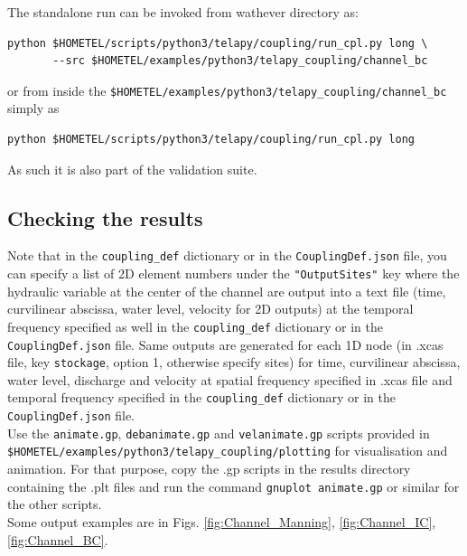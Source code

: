 \documentclass[Coupling]{../../data/TelemacDoc} %
\begin{document}
The standalone run can be invoked from wathever
directory as:
\begin{verbatim}
python $HOMETEL/scripts/python3/telapy/coupling/run_cpl.py long \
       --src $HOMETEL/examples/python3/telapy_coupling/channel_bc
\end{verbatim}
or from inside the
\texttt{\$HOMETEL/examples/python3/telapy\_coupling/channel\_bc}
simply as
\begin{verbatim}
python $HOMETEL/scripts/python3/telapy/coupling/run_cpl.py long
\end{verbatim}
As such it is also part of the validation suite.

\subsection{Checking the results}
Note that in the \texttt{coupling\_def} dictionary or in the
\texttt{CouplingDef.json} file, you can specify a 
list of 2D element numbers under the \texttt{"OutputSites"} key where
the hydraulic variable at the center of the channel are output into a
text file (time, curvilinear abscissa, water level, velocity for 2D
outputs) at the temporal frequency specified as well in the
\texttt{coupling\_def} dictionary or in the
\texttt{CouplingDef.json} file. Same outputs are generated for each 1D
node (in .xcas file, key \texttt{stockage}, option 1, otherwise
specify sites) for  
time, curvilinear abscissa, water level, discharge and velocity at
spatial frequency specified in .xcas file and temporal frequency
specified in the \texttt{coupling\_def} dictionary or in the
\texttt{CouplingDef.json} file.\\

Use the \texttt{animate.gp}, \texttt{debanimate.gp} and \texttt{velanimate.gp}
scripts provided in\\
\texttt{\$HOMETEL/examples/python3/telapy\_coupling/plotting} for
visualisation and animation.  
For that purpose, copy the .gp scripts in the results directory
containing the .plt files and run the command \texttt{gnuplot
  animate.gp} or similar for the other scripts.\\
Some output examples are in Figs. \ref{fig:Channel_Manning}, \ref{fig:Channel_IC}, \ref{fig:Channel_BC}.
\end{document}
